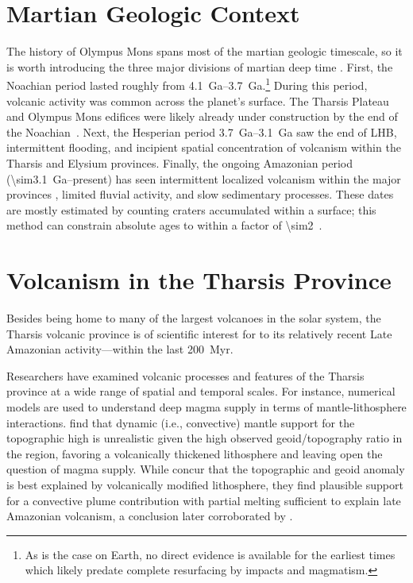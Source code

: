 \section{Martian Geologic Context}

The history of Olympus Mons spans most of the martian geologic timescale, so it is worth introducing the three major divisions of martian deep time \parencite{carr_geologic_2010}. First, the Noachian period lasted roughly from \qtyrange{4.1}{3.7}{Ga}.\footnote{As is the case on Earth, no direct evidence is available for the earliest times which likely predate complete resurfacing by impacts and magmatism.} During this period, volcanic activity was common across the planet's surface. The Tharsis Plateau and Olympus Mons edifices were likely already under construction by the end of the Noachian~\parencite[cf.][]{isherwood_volcanic_2013,broquet_gravitational_2019}. Next, the Hesperian period \qtyrange{3.7}{3.1}{Ga} saw the end of \ac{LHB}, intermittent flooding, and incipient spatial concentration of volcanism within the Tharsis and Elysium provinces. Finally, the ongoing Amazonian period (\qty{\sim3.1}{Ga}--present) has seen intermittent localized volcanism within the major provinces \parencite[e.g.,][]{grott_long-term_2013}, limited fluvial activity, and slow sedimentary processes. These dates are mostly estimated by counting craters accumulated within a surface; this method can constrain absolute ages to within a factor of \num{\sim2}~\parencite[e.g.,][]{kneissl_map-projection-independent_2011}.

\section{Volcanism in the Tharsis Province}

Besides being home to many of the largest volcanoes in the solar system, the Tharsis volcanic province is of scientific interest for to its relatively recent Late Amazonian activity---within the last \qty{200}{Myr}.

Researchers have examined volcanic processes and features of the Tharsis province at a wide range of spatial and temporal scales. For instance, numerical models are used to understand deep magma supply in terms of mantle-lithosphere interactions. \textcite{roberts_plume-induced_2004} find that dynamic (i.e., convective) mantle support for the topographic high is unrealistic given the high observed geoid/topography ratio in the region, favoring a volcanically thickened lithosphere and leaving open the question of magma supply. While \textcite{redmond_numerical_2004} concur that the topographic and geoid anomaly is best explained by volcanically modified lithosphere, they find plausible support for a convective plume contribution with partial melting sufficient to explain late Amazonian volcanism, a conclusion later corroborated by \textcite{plesa_thermal_2018}.

